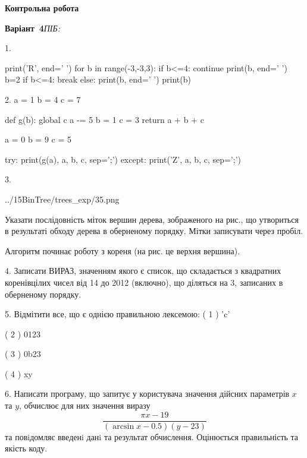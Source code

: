 \documentclass[11pt]{article}
\begin{document}
{\large\textbf{Контрольна робота}}

\textbf{Варіант \No\,4}\hfill \textit{ПІБ:}\,\underline{\hspace{60mm}}
\vspace{4mm}

1. 

print('R', end=' ')
for b in range(-3,-3,3):
    if b<=4:
        continue
        print(b, end=' ')
        b=2
    if b<=4:
        break
    else:
        print(b, end=' ')
    print(b)
\vspace{5mm}

2. 
a = 1
b = 4
c = 7

def g(b):
global c    a -= 5
    b = 1
    c = 3
    return a + b + c

a = 0
b = 9
c = 5

try:
    print(g(a), a, b, c, sep=';')
except:
    print('Z', a, b, c, sep=';')
\vspace{5mm}

3. 

\begin{center}
	{../15BinTree/trees_exp/35.png}
\end{center}
Указати послідовність міток вершин дерева, зображеного на рис., що утвориться в результаті обходу дерева в оберненому порядку. Мітки записувати через пробіл.\par Алгоритм починає роботу з кореня (на рис. це верхня вершина).
\vspace{5mm}

4. 
Записати ВИРАЗ, значенням якого є список, що складається з квадратних коренівцілих чисел від 14 до 2012 (включно), що діляться на 3, записаних в оберненому порядку.\vspace{5mm}

5. %
Відмітити все, що є однією правильною лексемою:
( 1 ) 'c'

( 2 ) 0123

( 3 ) 0b23

( 4 ) xy
\vspace{5mm}

6. 
Написати програму, що запитує у користувача значення дійсних параметрів $x$ та $y$, обчислює для них значення виразу 
$$\frac{\pi x - 19}{(\arcsin x - 0.5) (y - 23)}$$ 
та повiдомляє введенi данi та результат обчислення.
 Оцінюється правильність та якість коду.
\end{document}
